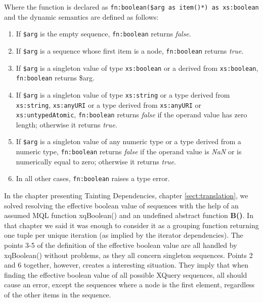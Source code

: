 Where the function is declared as \texttt{fn:boolean(\$arg as item()*) as xs:boolean} and the dynamic semantics are
defined as follows\cite{w3cfuncOps}:

\begin{enumerate}
  \item If \texttt{\$arg} is the empty sequence, \texttt{fn:boolean} returns \textit{false}.
  \item If \texttt{\$arg} is a sequence whose first item is a node, \texttt{fn:boolean} returns \textit{true}.
  \item If \texttt{\$arg} is a singleton value of type \texttt{xs:boolean} or a derived from \texttt{xs:boolean},
  \texttt{fn:boolean} returns \$arg.
  \item If \texttt{\$arg} is a singleton value of type \texttt{xs:string} or a type derived from \texttt{xs:string},
  \texttt{xs:anyURI} or a type derived from \texttt{xs:anyURI} or \texttt{xs:untypedAtomic}, \texttt{fn:boolean}
  returns \textit{false} if the operand value has zero length; otherwise it returns \textit{true}.
  \item If \texttt{\$arg} is a singleton value of any numeric type or a type derived from a numeric type,
  \texttt{fn:boolean} returns \textit{false} if the operand value is \textit{NaN} or is numerically equal to zero;
  otherwise it returns \textit{true}.
  \item In all other cases, \texttt{fn:boolean} raises a type error.
\end{enumerate}

In the chapter presenting Tainting Dependencies, chapter \ref{sect:translation}, we solved resolving the effective
boolean value of sequences with the help of an assumed MQL function \textsf{xqBoolean()} and an undefined abstract
function \textbf{B()}. In that chapter we said it was enough to consider it as a grouping function returning one
tuple per unique iteration (as implied by the iterator dependencies). The points 3-5 of the definition of the
effective boolean value are all handled by \textsf{xqBoolean()} without problems, as they all concern singleton
sequences. Points 2 and 6 together, however, creates a interesting situation.
They imply that when finding the effective boolean value of all possible XQuery sequences, all should cause an error, except the sequences where a
node is the first element, regardless of the other items in the sequence.

